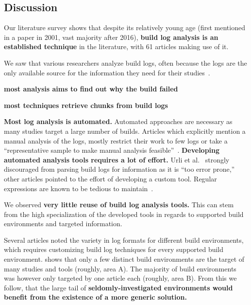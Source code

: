 \subsection{Discussion}
\label{sec:lit-sur:discussion}

Our literature survey shows that despite its relatively young age
(first mentioned in a paper in 2001, vast majority after
2016), \textbf{build log analysis is an established technique}
in the literature, with 61 articles making use of it.



We saw that various researchers analyze build logs, often because the
logs are the only available source for the
information they need for their studies~\cite{ren2018automated,
seo2014programmers,beller2017oops,zampetti2017open,rausch2017empirical}.

\textbf{most analysis aims to find out why the build failed}

\textbf{most techniques retrieve chunks from build logs}

\textbf{Most log analysis is automated.} Automated approaches are
necessary as many studies target a large number of builds.
Articles
which explicitly mention a manual analysis of the logs, mostly
restrict their work to few logs or take a ``representative sample to
make manual analysis feasible''~\cite{zolfagharinia2017not}.
\textbf{Developing automated analysis tools requires a lot of effort.}
Urli et al.~\cite{urli2018design} strongly discouraged from parsing
build logs for information as it is ``too error prone,'' other
articles pointed to the effort of developing a custom tool.
Regular expressions are known to be tedious to
maintain~\cite{michael2019regexes}.

We observed \textbf{very little reuse of build log analysis tools.}
This can stem from the
high specialization of the developed tools in regards to supported
build environments and targeted information.

Several articles noted the variety in log formats for different build
environments, which requires customizing build log techniques for
every supported build environment.
 shows that only a few distinct
build environments are the target of
many studies and tools (roughly, area A).
The majority of build environments was however only targeted by one
article each (roughly, area B).
From this we follow, that the large tail of
\textbf{seldomly-investigated
environments would benefit from the
existence of a more generic solution.}

